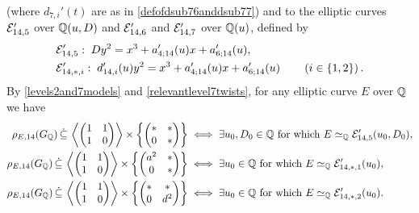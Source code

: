 (where $d_{7,i}'(t)$ are as in \eqref{defofdsub76anddsub77}) and to the elliptic curves $\mathcal{E}_{14,5}'$ over $\mathbb{Q}(u,D)$ and $\mathcal{E}_{14,6}'$ and $\mathcal{E}_{14,7}'$ over $\mathbb{Q}(u)$, defined by
\begin{equation} \label{definitionofmcEsub145primeandmcEsub14iprime}
\begin{split}
&\mathcal{E}_{14,5}' : \; D y^2 = x^3 + a_{4;14}'(u) x + a_{6;14}'(u), \\
&\mathcal{E}_{14,*,i}' : \; d_{14,i}'(u) y^2 = x^3 + a_{4;14}'(u) x + a_{6;14}'(u) \quad\quad \left( i \in \{ 1, 2 \} \right).
\end{split}
\end{equation}
By \eqref{levels2and7models} and \eqref{relevantlevel7twists}, for any elliptic curve $E$ over $\mathbb{Q}$ we have
\begin{equation} \label{twistedmodelslevel14forlateruse}
\begin{split}
\rho_{E,14}(G_{\mathbb{Q}}) \, \dot\subseteq \, \left\langle \begin{pmatrix} 1 & 1 \\ 1 & 0 \end{pmatrix} \right\rangle \times \left\{ \begin{pmatrix} * & * \\ 0 & * \end{pmatrix} \right\} \; &\Longleftrightarrow \; \exists u_0, D_0 \in \mathbb{Q} \text{ for which } E \simeq_{\mathbb{Q}} \mathcal{E}_{14,5}'(u_0,D_0), \\
\rho_{E,14}(G_{\mathbb{Q}}) \, \dot\subseteq \, \left\langle \begin{pmatrix} 1 & 1 \\ 1 & 0 \end{pmatrix} \right\rangle \times \left\{ \begin{pmatrix} a^2 & * \\ 0 & * \end{pmatrix} \right\} \; &\Longleftrightarrow \; \exists u_0 \in \mathbb{Q} \text{ for which } E \simeq_{\mathbb{Q}} \mathcal{E}_{14,*,1}'(u_0), \\
\rho_{E,14}(G_{\mathbb{Q}}) \, \dot\subseteq \, \left\langle \begin{pmatrix} 1 & 1 \\ 1 & 0 \end{pmatrix} \right\rangle \times \left\{ \begin{pmatrix} * & * \\ 0 & d^2 \end{pmatrix} \right\} \; &\Longleftrightarrow \; \exists u_0 \in \mathbb{Q} \text{ for which } E \simeq_{\mathbb{Q}} \mathcal{E}_{14,*,2}'(u_0).
\end{split}
\end{equation}
